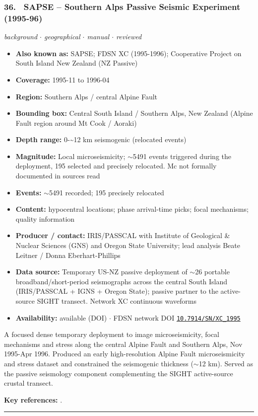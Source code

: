 \documentclass[10pt,a4paper]{article}
\newcommand{\catentryrule}{\par\vspace{3pt}\noindent\textcolor{rulegrey}{\rule{\linewidth}{0.3pt}}\par\vspace{5pt}}
\newcommand{\kv}[2]{\item \textbf{#1:} #2}
\begin{document}
\subsubsection*{\hypertarget{c:36}{36.}~ SAPSE -- Southern Alps Passive Seismic Experiment (1995-96)}
{\small\itshape background $\cdot$ geographical $\cdot$ manual $\cdot$ reviewed}\par\vspace{2pt}
\begin{itemize}[leftmargin=1.3em,itemsep=0.6pt,topsep=1pt,parsep=0pt]
\kv{Also known as}{SAPSE; FDSN XC (1995-1996); Cooperative Project on South Island New Zealand (NZ Passive)}
\kv{Coverage}{1995-11 to 1996-04}
\kv{Region}{Southern Alps / central Alpine Fault}
\kv{Bounding box}{Central South Island / Southern Alps, New Zealand (Alpine Fault region around Mt Cook / Aoraki)}
\kv{Depth range}{0-\textasciitilde{}12 km seismogenic (relocated events)}
\kv{Magnitude}{Local microseismicity; $\sim$5491 events triggered during the deployment, 195 selected and precisely relocated. Mc not formally documented in sources read}
\kv{Events}{$\sim$5491 recorded; 195 precisely relocated}
\kv{Content}{hypocentral locations; phase arrival-time picks; focal mechanisms; quality information}
\kv{Producer / contact}{IRIS/PASSCAL with Institute of Geological \& Nuclear Sciences (GNS) and Oregon State University; lead analysis Beate Leitner / Donna Eberhart-Phillips}
\kv{Data source}{Temporary US-NZ passive deployment of $\sim$26 portable broadband/short-period seismographs across the central South Island (IRIS/PASSCAL + IGNS + Oregon State); passive partner to the active-source SIGHT transect. Network XC continuous waveforms}
\kv{Availability}{available (DOI) $\cdot$ FDSN network DOI \href{https://doi.org/10.7914/SN/XC_1995}{\nolinkurl{10.7914/SN/XC_1995}}}
\end{itemize}
\par\vspace{2pt}A focused dense temporary deployment to image microseismicity, focal mechanisms and stress along the central Alpine Fault and Southern Alps, Nov 1995-Apr 1996. Produced an early high-resolution Alpine Fault microseismicity and stress dataset and constrained the seismogenic thickness ($\sim$12 km). Served as the passive seismology component complementing the SIGHT active-source crustal transect.
\par\vspace{2pt}\textbf{Key references:} \cite{Leitner2001,IRISPASSCAL1995}.
\catentryrule
\end{document}
